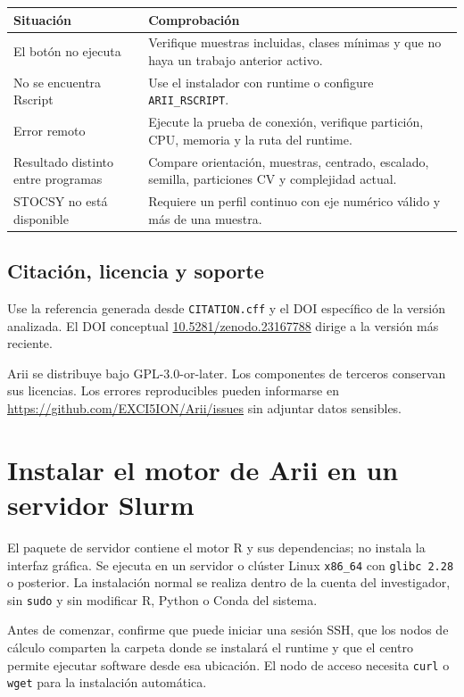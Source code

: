 \documentclass[11pt,a4paper,openany]{report}
\newcommand{\code}[1]{\texttt{#1}}
\begin{document}
\begin{tabularx}{\textwidth}{@{}p{}X@{}}
\toprule
\textbf{Situación} & \textbf{Comprobación} \\
\midrule
El botón no ejecuta & Verifique muestras incluidas, clases mínimas y que no haya
un trabajo anterior activo. \\
No se encuentra Rscript & Use el instalador con runtime o configure
\code{ARII\_RSCRIPT}. \\
Error remoto & Ejecute la prueba de conexión, verifique partición, CPU, memoria y
la ruta del runtime. \\
Resultado distinto entre programas & Compare orientación, muestras, centrado,
escalado, semilla, particiones CV y complejidad actual. \\
STOCSY no está disponible & Requiere un perfil continuo con eje numérico válido y
más de una muestra. \\
\bottomrule
\end{tabularx}

\section{Citación, licencia y soporte}

Use la referencia generada desde \code{CITATION.cff} y el DOI específico de la
versión analizada. El DOI conceptual
\href{https://doi.org/10.5281/zenodo.23167788}{10.5281/zenodo.23167788} dirige a
la versión más reciente.

Arii se distribuye bajo GPL-3.0-or-later. Los componentes de terceros conservan
sus licencias. Los errores reproducibles pueden informarse en
\url{https://github.com/EXCI5ION/Arii/issues} sin adjuntar datos sensibles.

\appendix
\chapter{Instalar el motor de Arii en un servidor Slurm}

El paquete de servidor contiene el motor R y sus dependencias; no instala la
interfaz gráfica. Se ejecuta en un servidor o clúster Linux \code{x86\_64} con
\code{glibc 2.28} o posterior. La instalación normal se realiza dentro de la
cuenta del investigador, sin \code{sudo} y sin modificar R, Python o Conda del
sistema.

Antes de comenzar, confirme que puede iniciar una sesión SSH, que los nodos de
cálculo comparten la carpeta donde se instalará el runtime y que el centro
permite ejecutar software desde esa ubicación. El nodo de acceso necesita
\code{curl} o \code{wget} para la instalación automática.
\end{document}
